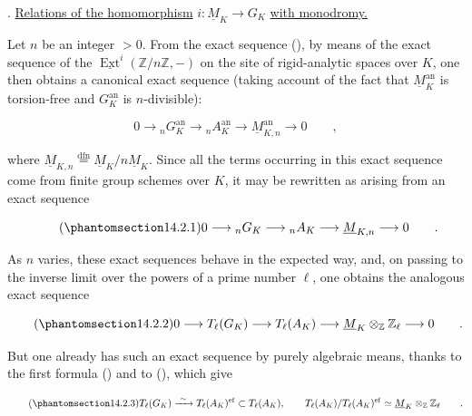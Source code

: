 \par\medskip
\noindent
{}. \underline{Relations of the homomorphism}
$i:\underline M_K\longrightarrow G_K$ \underline{with monodromy.}

Let $n$ be an integer $>0$.  From the exact sequence (), by
means of the exact sequence of the
$\underline{\operatorname{Ext}}^i(\mathbb Z/n\mathbb Z,-)$ on the
site of rigid-analytic spaces over $K$, one then obtains a canonical
exact sequence (taking account of the fact that
$\underline M_K^{\mathrm{an}}$ is torsion-free and
$G_K^{\mathrm{an}}$ is $n$-divisible):

\begin{equation*}
 0\longrightarrow{}_nG_K^{\mathrm{an}}
 \longrightarrow{}_nA_K^{\mathrm{an}}
 \longrightarrow\underline M_{K,n}^{\mathrm{an}}
 \longrightarrow0\qquad ,
\end{equation*}

\noindent
where
$\underline M_{K,n}\overset{\mathrm{dfn}}{=}
\underline M_K/n\underline M_K$.  Since all the terms occurring in
this exact sequence come from finite group schemes over $K$, it may be
rewritten as arising from an exact sequence

\begin{equation}\tag{\SGARefTarget{sga7.sga7i.eix.n14-2-1}{14.2.1}}
 0\longrightarrow{}_nG_K\longrightarrow{}_nA_K
 \longrightarrow\underline M_{K,n}\longrightarrow0\qquad .
\end{equation}

\noindent
As $n$ varies, these exact sequences behave in the expected way, and,
on passing to the inverse limit over the powers of a prime number
$\ell$, one obtains the analogous exact sequence

\begin{equation}\tag{\SGARefTarget{sga7.sga7i.eix.n14-2-2}{14.2.2}}
 0\longrightarrow T_\ell(G_K)\longrightarrow T_\ell(A_K)
 \longrightarrow\underline M_K\otimes_{\mathbb Z}\mathbb Z_\ell
 \longrightarrow0\qquad .
\end{equation}

\noindent
But one already has such an exact sequence by purely algebraic means,
thanks to the first formula () and to (), which give

\begin{equation}\tag{\SGARefTarget{sga7.sga7i.eix.n14-2-3}{14.2.3}}
 T_\ell(G_K)\xrightarrow{\ \sim\ }T_\ell(A_K)^{\mathrm{ef}}
 \subset T_\ell(A_K),\qquad
 T_\ell(A_K)/T_\ell(A_K)^{\mathrm{ef}}
 \simeq\underline M_K\otimes_{\mathbb Z}\mathbb Z_\ell\qquad .
\end{equation}

